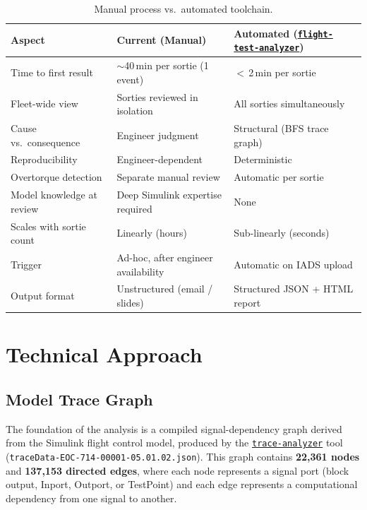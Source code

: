 \documentclass[11pt, letterpaper]{article}
\newcommand{\repoFTA}{\href{https://github.com/francis-barchesky/flight-test-analyzer}{\texttt{flight-test-analyzer}}}
\newcommand{\repoTrace}{\href{https://github.com/francis-barchesky/trace-analyzer}{\texttt{trace-analyzer}}}
\begin{document}
\medskip
\begin{table}[h]
\centering
\caption{Manual process vs.\ automated toolchain.}
\begin{tabularx}{\textwidth}{@{} l X X @{}}
\toprule
\textbf{Aspect} & \textbf{Current (Manual)} & \textbf{Automated (\repoFTA{})} \\
\midrule
Time to first result    & $\sim$40\,min per sortie (1 event) & $<$\,2\,min per sortie \\
Fleet-wide view         & Sorties reviewed in isolation     & All sorties simultaneously \\
Cause vs.\ consequence  & Engineer judgment                 & Structural (BFS trace graph) \\
Reproducibility         & Engineer-dependent                & Deterministic \\
Overtorque detection    & Separate manual review            & Automatic per sortie \\
Model knowledge at review & Deep Simulink expertise required & None \\
Scales with sortie count & Linearly (hours)                 & Sub-linearly (seconds) \\
Trigger                 & Ad-hoc, after engineer availability & Automatic on IADS upload \\
Output format           & Unstructured (email / slides)     & Structured JSON + HTML report \\
\bottomrule
\end{tabularx}
\end{table}

\section{Technical Approach}

\subsection{Model Trace Graph}

The foundation of the analysis is a compiled signal-dependency graph derived
from the Simulink flight control model, produced by the \repoTrace{} tool
(\texttt{traceData-EOC-714-00001-05.01.02.json}). This graph contains
\textbf{22{,}361 nodes} and \textbf{137{,}153 directed edges}, where each node
represents a signal port (block output, Inport, Outport, or TestPoint) and each
edge represents a computational dependency from one signal to another.
\end{document}
